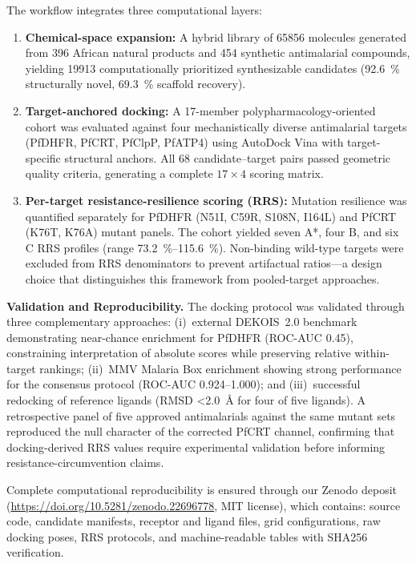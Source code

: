 \documentclass[11pt,letterpaper]{article}
\begin{document}
The workflow integrates three computational layers:
\begin{enumerate}[leftmargin=*]
\item \textbf{Chemical-space expansion:} A hybrid library of \num{65856} molecules generated from \num{396} African natural products and \num{454} synthetic antimalarial compounds, yielding \num{19913} computationally prioritized synthesizable candidates (\qty{92.6}{\percent} structurally novel, \qty{69.3}{\percent} scaffold recovery).

\item \textbf{Target-anchored docking:} A 17-member polypharmacology-oriented cohort was evaluated against four mechanistically diverse antimalarial targets (PfDHFR, PfCRT, PfClpP, PfATP4) using AutoDock Vina with target-specific structural anchors. All \num{68} candidate--target pairs passed geometric quality criteria, generating a complete $\num{17}\times\num{4}$ scoring matrix.

\item \textbf{Per-target resistance-resilience scoring (RRS):} Mutation resilience was quantified separately for PfDHFR (N51I, C59R, S108N, I164L) and PfCRT (K76T, K76A) mutant panels. The cohort yielded seven A*, four B, and six C RRS profiles (range \qtyrange{73.2}{115.6}{\percent}). Non-binding wild-type targets were excluded from RRS denominators to prevent artifactual ratios---a design choice that distinguishes this framework from pooled-target approaches.
\end{enumerate}

\vspace{0.3em}

\noindent\textbf{Validation and Reproducibility.}
The docking protocol was validated through three complementary approaches: (i)~external DEKOIS~2.0 benchmark demonstrating near-chance enrichment for PfDHFR (ROC-AUC \num{0.45}), constraining interpretation of absolute scores while preserving relative within-target rankings; (ii)~MMV Malaria Box enrichment showing strong performance for the consensus protocol (ROC-AUC \numrange{0.924}{1.000}); and (iii)~successful redocking of reference ligands (RMSD \qty{<2.0}{\angstrom} for four of five ligands). A retrospective panel of five approved antimalarials against the same mutant sets reproduced the null character of the corrected PfCRT channel, confirming that docking-derived RRS values require experimental validation before informing resistance-circumvention claims.

Complete computational reproducibility is ensured through our Zenodo deposit (\url{https://doi.org/10.5281/zenodo.22696778}, MIT license), which contains: source code, candidate manifests, receptor and ligand files, grid configurations, raw docking poses, RRS protocols, and machine-readable tables with SHA256 verification.
\end{document}
